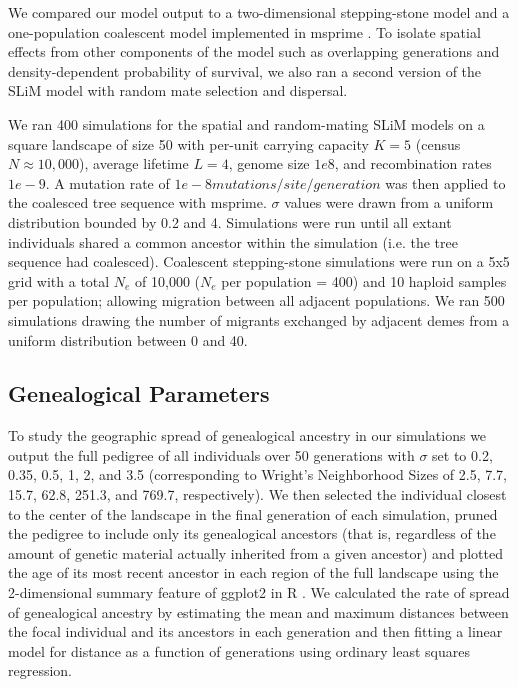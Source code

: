\documentclass[9pt,twocolumn,twoside]{gsajnl}
\begin{document}
We compared our model output to a two-dimensional stepping-stone model and a one-population coalescent model implemented in msprime \citep{Kelleher2016}. To isolate spatial effects from other components of the model such as overlapping generations and density-dependent probability of survival, we also ran a second version of the SLiM model with random mate selection and dispersal. 

We ran 400 simulations for the spatial and random-mating SLiM models on a square landscape of size 50 with per-unit carrying capacity $K=5$ (census $N \approx 10,000$), average lifetime $L=4$, genome size $1e8$, and recombination rates $1e-9$. A mutation rate of $1e-8 mutations/site/generation$ was then applied to the coalesced tree sequence with msprime. $\sigma$ values were drawn from a uniform distribution bounded by 0.2 and 4. Simulations were run until all extant individuals shared a common ancestor within the simulation (i.e. the tree sequence had coalesced). Coalescent stepping-stone simulations were run on a 5x5 grid with a total $N_{e}$ of 10,000 ($N_{e}$ per population = 400) and 10 haploid samples per population; allowing migration between all adjacent populations. We ran 500 simulations drawing the number of migrants exchanged by adjacent demes from a uniform distribution between 0 and 40.

\subsection{Genealogical Parameters}
To study the geographic spread of genealogical ancestry in our simulations we output the full pedigree of all individuals over 50 generations with $\sigma$ set to 0.2, 0.35, 0.5, 1, 2, and 3.5 (corresponding to Wright's Neighborhood Sizes of 2.5, 7.7, 15.7, 62.8, 251.3, and 769.7, respectively). We then selected the individual closest to the center of the landscape in the final generation of each simulation, pruned the pedigree to include only its genealogical ancestors (that is, regardless of the amount of genetic material actually inherited from a given ancestor) and plotted the age of its most recent ancestor in each region of the full landscape using the 2-dimensional summary feature of ggplot2 in R \citep{Wickham2016}. We calculated the rate of spread of genealogical ancestry by estimating the mean and maximum distances between the focal individual and its ancestors in each generation and then fitting a linear model for distance as a function of generations using ordinary least squares regression. 
\end{document}
